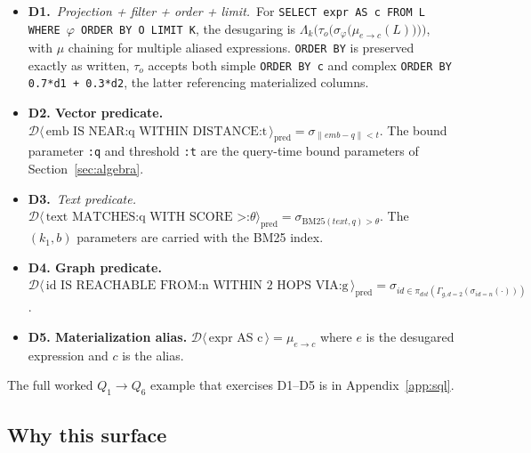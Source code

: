 \documentclass[sigconf]{acmart}
\theoremstyle{plain}
\theoremstyle{definition}
\theoremstyle{remark}
\begin{document}
\begin{itemize}[leftmargin=*, itemsep=0pt]
  \item \textbf{D1.}\ \textit{Projection + filter + order + limit.}\ For
    \texttt{SELECT expr AS c FROM L WHERE $\varphi$ ORDER BY O LIMIT K},
    the desugaring is
    $\Lambda_k\bigl(\tau_o\bigl(\sigma_\varphi\bigl(\mu_{e\to c}(L)\bigr)\bigr)\bigr)$,
    with $\mu$ chaining for multiple aliased expressions.
    \texttt{ORDER BY} is preserved exactly as written, $\tau_o$
    accepts both simple \texttt{ORDER BY c} and complex
    \texttt{ORDER BY 0.7*d1 + 0.3*d2}, the latter referencing
    materialized columns.
  \item \textbf{D2. Vector predicate.}
    $\mathcal{D}\!\langle\,\text{emb IS NEAR:q WITHIN DISTANCE:t}\,\rangle_{\mathrm{pred}}
    = \sigma_{\|\mathit{emb} - q\| < t}$. The bound parameter
    \texttt{:q} and threshold \texttt{:t} are the query-time bound
    parameters of Section~\ref{sec:algebra}.
  \item \textbf{D3.}\ \textit{Text predicate.}
    $\mathcal{D}\!\langle\,\text{text MATCHES:q WITH SCORE >:}\theta\rangle_{\mathrm{pred}}
    = \sigma_{\mathrm{BM25}(\mathit{text}, q) > \theta}$. The
    $(k_1, b)$ parameters are carried with the BM25 index.
  \item \textbf{D4. Graph predicate.}
    $\mathcal{D}\!\langle\,\text{id IS REACHABLE FROM:n WITHIN 2 HOPS VIA:g}\,\rangle_{\mathrm{pred}}
    = \sigma_{\mathit{id} \in \pi_{\mathit{dst}}(\Gamma_{g,d=2}(\sigma_{\mathit{id}=n}(\cdot)))}$.
  \item \textbf{D5. Materialization alias.}
    $\mathcal{D}\!\langle\,\text{expr AS c}\,\rangle = \mu_{e \to c}$
    where $e$ is the desugared expression and $c$ is the alias.
\end{itemize}

The full worked $Q_1 \to Q_6$ example that exercises D1--D5 is in
Appendix~\ref{app:sql}.

\subsection{Why this surface}\label{sec:sql:why}
\end{document}
